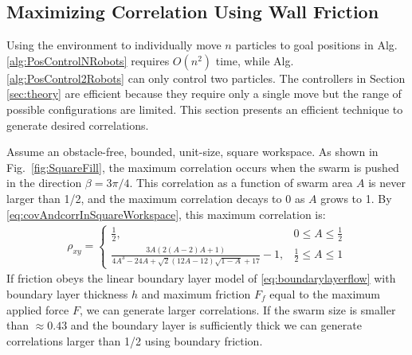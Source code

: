 \subsection{Maximizing Correlation Using Wall Friction}\label{subsec:ClosedLoopCovarianceControl}
Using the environment to individually move $n$ particles to goal positions in Alg. \ref{alg:PosControlNRobots} requires $O(n^2)$ time, while  Alg. \ref{alg:PosControl2Robots} can only control two particles. The controllers in Section \ref{sec:theory} are efficient because they require only a single move but the range of possible configurations are limited. This section presents an efficient technique to generate desired correlations.

Assume an obstacle-free, bounded, unit-size, square workspace. 
 As shown in Fig.~\ref{fig:SquareFill}, the maximum correlation occurs when the swarm is pushed in the direction $\beta = 3\pi/4$. 
 This correlation as a function of swarm area $A$ is never larger than 1/2, and the maximum correlation decays to 0 as $A$ grows to 1. By  \eqref{eq:covAndcorrInSquareWorkspace}, this maximum correlation is:
\begin{align} \label{eq:GravityCorrelation}
\rho_{xy} =  \begin{cases}  \frac{1}{2}  , &  0\le A\le \frac{1}{2}  \\
 \frac{3 A (2 (A-2) A+1)}{4 A^3-24 A+\sqrt{2} (12 A-12) \sqrt{1-A}+17}-1
 , & \frac{1}{2} \le A\le 1
\end{cases}
\end{align}
 If friction obeys the linear boundary layer model of \eqref{eq:boundarylayerflow} with boundary layer thickness $h$ and maximum friction $F_f$ equal to the maximum applied force $F$, we can generate  larger correlations.
 If the swarm size is smaller than $\approx 0.43$ and the boundary layer is sufficiently thick we can generate correlations larger than 1/2  using boundary friction.

